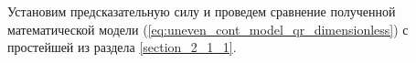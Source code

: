 Установим предсказательную силу и проведем сравнение полученной математической модели (\ref{eq:uneven_cont_model_qr_dimensionless}) с простейшей из раздела \ref{section_2_1_1}.

%
%
%
%
%
%
%
%
